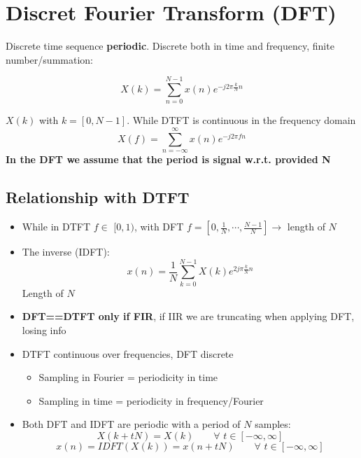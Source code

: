
\section{Discret Fourier Transform (DFT)}
Discrete time sequence \textbf{periodic}. Discrete both in time and frequency, finite number/summation:
\begin{LARGE}
    $$
    X(k)=\sum_{n=0}^{N-1} x(n)e^{-j2\pi \frac{k}{N}n}
    $$
\end{LARGE}
$X(k)$ with $k=[0,N-1]$. While DTFT is continuous in the frequency domain
$$
X(f)=\sum_{n=-\infty}^\infty x(n)e^{-j2\pi fn}
$$
\textbf{In the DFT we assume that the period is signal w.r.t. provided N}

\subsection{Relationship with DTFT}
\begin{itemize}
    \item While in DTFT $f\in\,\,[0,1)$, with DFT $f=\left[0,\frac{1}{N},\cdots,\frac{N-1}{N}\right]\rightarrow$ length of $N$
    \item The inverse (IDFT):
    $$
    x(n)=\frac{1}{N}\sum_{k=0}^{N-1}X(k)e^{2j\pi\frac{k}{N}n}
    $$
    Length of $N$
    \item \textbf{DFT==DTFT only if FIR}, if IIR we are truncating when applying DFT, losing info
    \item DTFT continuous over frequencies, DFT discrete
    \begin{itemize}
        \item Sampling in Fourier = periodicity in time
        \item Sampling in time = periodicity in frequency/Fourier
    \end{itemize}
    \item Both DFT and IDFT are periodic with a period of $N$ samples:
    $$
    X(k+tN)=X(k)\qquad\forall\,\,t\in[-\infty,\infty]
    $$
    $$
    x(n)=IDFT(X(k))=x(n+tN)\qquad\forall\,\,t\in[-\infty,\infty]
    $$
\end{itemize}


